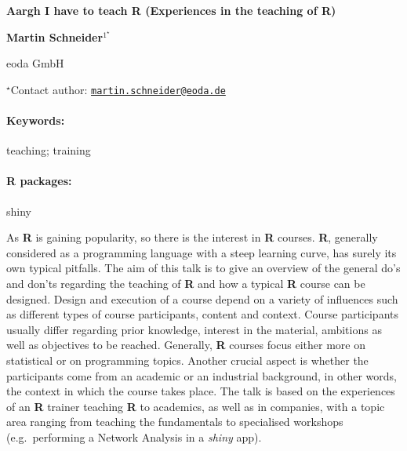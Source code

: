 \documentclass[11pt, a4paper]{article}
\renewcommand{\title}[1]{\begin{center}{\bf \LARGE #1}\end{center}}
\newcommand{\keywords}{\paragraph{Keywords:}}
\newcommand{\packages}{\paragraph{R packages:}}
\begin{document}
\pagestyle{empty}

\title{Aargh I have to teach R (Experiences in the teaching of R)}

\begin{center}
  {\bf Martin Schneider$^{1^\star}$}
\end{center}

\vskip 0.3cm

\begin{affiliations}
\begin{enumerate}
\begin{minipage}{0.915\textwidth}
\centering
\item eoda GmbH \\[-2pt]
\end{minipage}
\end{enumerate}
$^\star$Contact author: \href{mailto:martin.schneider@eoda.de}{\nolinkurl{martin.schneider@eoda.de}}\\
\end{affiliations}

\vskip 0.5cm

\begin{minipage}{0.915\textwidth}
\keywords teaching; training
\packages shiny
\end{minipage}

\vskip 0.8cm

As \textbf{R} is gaining popularity, so there is the interest in
\textbf{R} courses. \textbf{R}, generally considered as a programming
language with a steep learning curve, has surely its own typical
pitfalls. The aim of this talk is to give an overview of the general
do's and don'ts regarding the teaching of \textbf{R} and how a typical
\textbf{R} course can be designed. Design and execution of a course
depend on a variety of influences such as different types of course
participants, content and context. Course participants usually differ
regarding prior knowledge, interest in the material, ambitions as well
as objectives to be reached. Generally, \textbf{R} courses focus either
more on statistical or on programming topics. Another crucial aspect is
whether the participants come from an academic or an industrial
background, in other words, the context in which the course takes place.
The talk is based on the experiences of an \textbf{R} trainer teaching
\textbf{R} to academics, as well as in companies, with a topic area
ranging from teaching the fundamentals to specialised workshops
(e.g.~performing a Network Analysis in a \emph{shiny} app).
\end{document}

